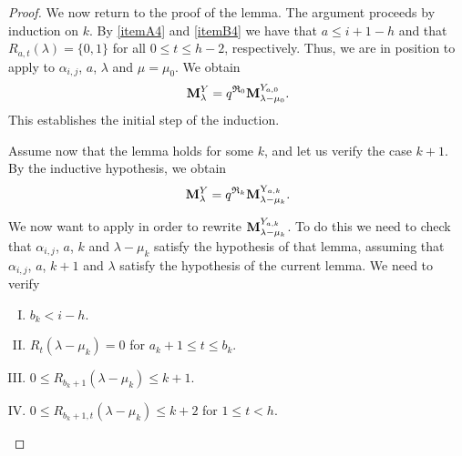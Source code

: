 \begin{proof}
We now return to the proof of the lemma. 
The argument proceeds by induction on $k$. 
By \cref{itemA4} and  \cref{itemB4} we have that $a\leq i+1-h$ and that $R_{a,t}(\lambda)=\{0,1\}$ for all $ 0\leq t \leq h-2$, respectively.
Thus, we are in position to apply  to $\alpha_{i,j}$, $a$,  $\lambda$ and $\mu=\mu_0$.
We obtain 
\begin{equation}
   \mathbf{M}_{\lambda}^{Y} = q^{ \mathfrak{R}_0} \mathbf{M}_{\lambda-\mu_0}^{Y_{a,0}}.  
\end{equation}
This establishes the initial step of the induction.


Assume now that the lemma holds for some $k$, and let us verify the case $k+1$. 
By the inductive hypothesis, we obtain
\begin{equation}\label{eq: poof fourth string lemma 1}
    \mathbf{M}_{\lambda}^{Y} = q^{   \mathfrak{R}_{k}}\mathbf{M}_{\lambda - \mu_{k}}^{\mathrm{Y}_{a,k}}.
\end{equation}

We now want to apply  in order to rewrite $\mathbf{M}_{\lambda-\mu_k}^{Y_{a,k}}$. 
To do this we need to check that  $\alpha_{i,j}$, $a$, $k$ and $\lambda -\mu_k$  satisfy the hypothesis of that lemma, assuming that $\alpha_{i,j}$, $a$, $k+1$ and $\lambda$ satisfy the hypothesis of the current lemma. 
We need to verify
 
\begin{enumerate}[(I)]
\item $b_{k}<i-h$.
\label{itemAAA}
\item $R_{t}(\lambda-\mu_k)=0$ for $a_{k}+1\leq t \leq b_{k}$. \label{itemBBB}
\item $0\leq R_{b_k+1}(\lambda -\mu_k) \leq k+1$.
\label{itemCCC}
\item $0\leq R_{b_k+1,t}(\lambda -\mu_k) \leq k+2$ for $1\leq t<h$.
\label{itemDDD}
\end{enumerate}




\end{proof}
